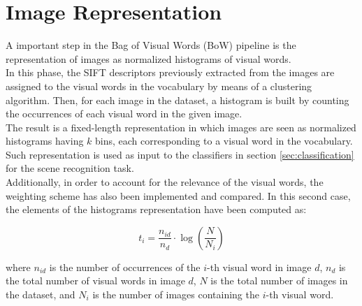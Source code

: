 \documentclass[../main.tex]{subfiles}
\begin{document}
\section{Image Representation}\label{sec:image-representation}

A important step in the Bag of Visual Words (BoW) pipeline is the representation of images as normalized histograms of visual words.\\
In this phase, the SIFT descriptors previously extracted from the images are assigned to the visual words in the vocabulary by means of a clustering algorithm. Then, for each image in the dataset, a histogram is built by counting the occurrences of each visual word in the given image.\\
The result is a fixed-length representation in which images are seen as normalized histograms having $k$ bins, each corresponding to a visual word in the vocabulary. Such representation is used as input to the classifiers in section \ref{sec:classification} for the scene recognition task.\\
Additionally, in order to account for the relevance of the visual words, the  weighting scheme has also been implemented and compared. In this second case, the elements of the histograms representation have been computed as:

\begin{equation}
    t_i = \frac{n_{id}}{n_{d}} \cdot \log\left(\frac{N}{N_i}\right)
\end{equation}

where $n_{id}$ is the number of occurrences of the $i$-th visual word in image $d$, $n_{d}$ is the total number of visual words in image $d$, $N$ is the total number of images in the dataset, and $N_i$ is the number of images containing the $i$-th visual word.\\
\end{document}
